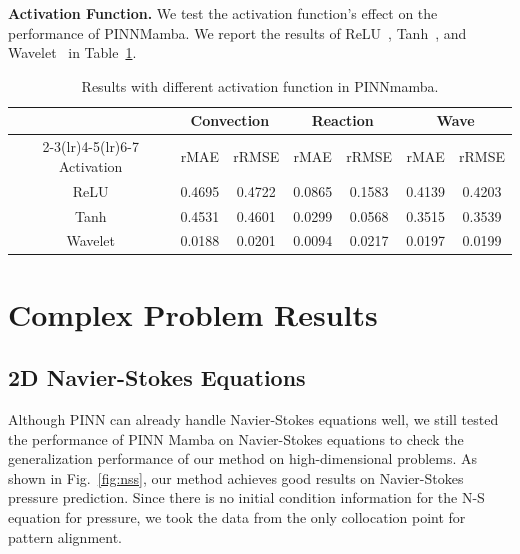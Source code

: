 \documentclass{article}
\theoremstyle{plain}
\theoremstyle{definition}
\theoremstyle{remark}
\begin{document}
\textbf{Activation Function.} We test the activation function's effect on the performance of PINNMamba. We report the results of ReLU~\cite{nair2010rectified}, Tanh~\cite{fan2000extended}, and Wavelet~\cite{zhao2024pinnsformer} in Table~\ref{tab:activation}.
\begin{table}[H]
\vspace{-3mm}
  \caption{Results with different activation function in PINNmamba.}
  
  \centering
    \small
  \begin{tabular}{c|cc|cc|cc}

    \toprule 
      &\multicolumn{2}{c}{Convection }&\multicolumn{2}{c}{Reaction}&\multicolumn{2}{c}{Wave}\\
    \cmidrule(lr){2-3}\cmidrule(lr){4-5}\cmidrule(lr){6-7}
   Activation & rMAE & rRMSE & rMAE & rRMSE & rMAE & rRMSE\\
   \midrule
   ReLU & 0.4695& 0.4722 & 0.0865 & 0.1583 &0.4139 &0.4203  \\
 Tanh & 0.4531& 0.4601& 0.0299 & 0.0568  & 0.3515 & 0.3539  \\
Wavelet &0.0188 & 0.0201 &0.0094 &0.0217 & 0.0197 &  0.0199\\


    

   

    \bottomrule
  \end{tabular}
  \normalsize
  \label{tab:activation}

\end{table}

\section{Complex Problem Results}
\label{apx:comp}

\subsection{2D Navier-Stokes Equations}

Although PINN can already handle Navier-Stokes equations well, we still tested the performance of PINN Mamba on Navier-Stokes equations to check the generalization performance of our method on high-dimensional problems. As shown in Fig.~\ref{fig:nss}, our method achieves good results on Navier-Stokes pressure prediction. Since there is no initial condition information for the N-S equation for pressure, we took the data from the only collocation point for pattern alignment.
\end{document}
